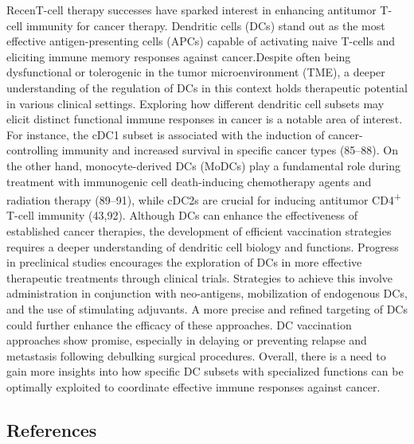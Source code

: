 \documentclass[
]{article}
\begin{document}
RecenT-cell therapy successes have sparked interest in enhancing
antitumor T-cell immunity for cancer therapy. Dendritic cells (DCs)
stand out as the most effective antigen-presenting cells (APCs) capable
of activating naive T-cells and eliciting immune memory responses
against cancer.Despite often being dysfunctional or tolerogenic in the
tumor microenvironment (TME), a deeper understanding of the regulation
of DCs in this context holds therapeutic potential in various clinical
settings. Exploring how different dendritic cell subsets may elicit
distinct functional immune responses in cancer is a notable area of
interest. For instance, the cDC1 subset is associated with the induction
of cancer-controlling immunity and increased survival in specific cancer
types (85--88). On the other hand, monocyte-derived DCs (MoDCs) play a
fundamental role during treatment with immunogenic cell death-inducing
chemotherapy agents and radiation therapy (89--91), while cDC2s are
crucial for inducing antitumor CD4\textsuperscript{+} T-cell immunity
(43,92). Although DCs can enhance the effectiveness of established
cancer therapies, the development of efficient vaccination strategies
requires a deeper understanding of dendritic cell biology and functions.
Progress in preclinical studies encourages the exploration of DCs in
more effective therapeutic treatments through clinical trials.
Strategies to achieve this involve administration in conjunction with
neo-antigens, mobilization of endogenous DCs, and the use of stimulating
adjuvants. A more precise and refined targeting of DCs could further
enhance the efficacy of these approaches. DC vaccination approaches show
promise, especially in delaying or preventing relapse and metastasis
following debulking surgical procedures. Overall, there is a need to
gain more insights into how specific DC subsets with specialized
functions can be optimally exploited to coordinate effective immune
responses against cancer.

\subsection{References}\label{references}
\end{document}
